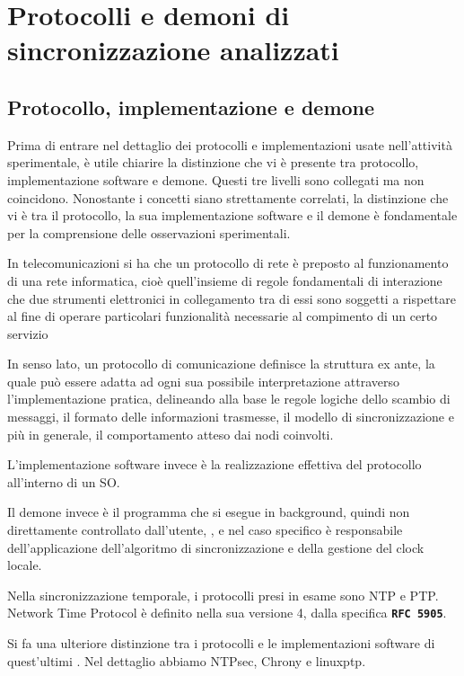\chapter{Protocolli e demoni di sincronizzazione analizzati}
\label{cha:protocolliAndDemoni}

\section{Protocollo, implementazione e demone}

Prima di entrare nel dettaglio dei protocolli e implementazioni usate nell'attività
sperimentale, è utile chiarire la distinzione che vi è presente tra protocollo, implementazione
software e demone. Questi tre livelli sono collegati ma non coincidono.
Nonostante i concetti siano strettamente correlati, la distinzione che vi è tra il protocollo, la sua implementazione 
software e il demone è fondamentale per la comprensione delle osservazioni sperimentali.

In telecomunicazioni si ha che un protocollo di rete è preposto al funzionamento di una rete informatica, cioè quell'insieme di 
regole fondamentali di interazione che due strumenti elettronici in collegamento tra di essi sono soggetti a rispettare al fine di 
operare particolari funzionalità necessarie al compimento di un certo servizio

In senso lato, un protocollo di comunicazione definisce la struttura ex ante, la
quale può essere adatta ad ogni sua possibile interpretazione attraverso l'implementazione
pratica, delineando alla base le regole logiche dello scambio di messaggi, il
formato delle informazioni trasmesse, il modello di sincronizzazione e più in generale,
il comportamento atteso dai nodi coinvolti. \cite{ProtocolloDiRete2026}

L'implementazione software invece è la realizzazione effettiva del protocollo all'interno di un SO.

Il demone invece è il programma che si esegue in background, quindi non direttamente controllato dall'utente, 
\cite{DaemonComputing2026}, e nel caso specifico è responsabile dell'applicazione dell'algoritmo
di sincronizzazione e della gestione del clock locale.

Nella sincronizzazione temporale, i protocolli presi in esame sono NTP e PTP. Network Time Protocol è definito nella sua
versione 4, dalla specifica \texttt{\textbf{RFC 5905}}.

Si fa una ulteriore distinzione tra i protocolli e le implementazioni software di quest'ultimi
. Nel dettaglio abbiamo NTPsec, Chrony e linuxptp.

